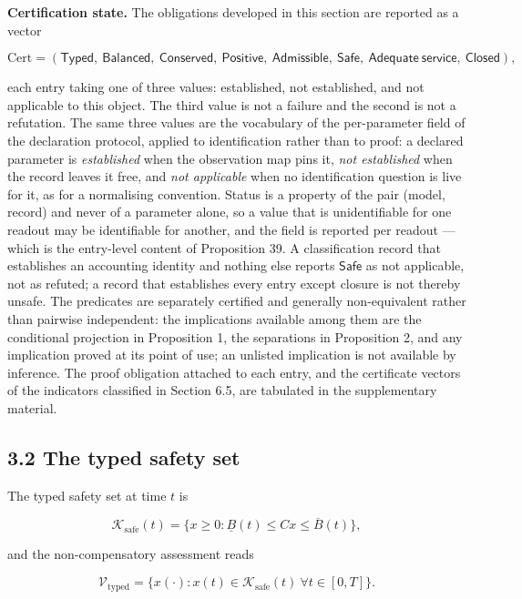 \documentclass[11pt]{article}
\begin{document}
\textbf{Certification state.} The obligations developed in this section are reported as a vector 

$$\mathrm{Cert}=(\mathsf{Typed},\ \mathsf{Balanced},\ \mathsf{Conserved},\ \mathsf{Positive},\ \mathsf{Admissible},\ \mathsf{Safe},\ \mathsf{Adequate\ service},\ \mathsf{Closed}),$$

 each entry taking one of three values: established, not established, and not applicable to this object. The third value is not a failure and the second is not a refutation. The same three values are the vocabulary of the per-parameter field of the declaration protocol, applied to identification rather than to proof: a declared parameter is \emph{established} when the observation map pins it, \emph{not established} when the record leaves it free, and \emph{not applicable} when no identification question is live for it, as for a normalising convention. Status is a property of the pair (model, record) and never of a parameter alone, so a value that is unidentifiable for one readout may be identifiable for another, and the field is reported per readout --- which is the entry-level content of Proposition 39. A classification record that establishes an accounting identity and nothing else reports \(\mathsf{Safe}\) as not applicable, not as refuted; a record that establishes every entry except closure is not thereby unsafe. The predicates are separately certified and generally non-equivalent rather than pairwise independent: the implications available among them are the conditional projection in Proposition 1, the separations in Proposition 2, and any implication proved at its point of use; an unlisted implication is not available by inference. The proof obligation attached to each entry, and the certificate vectors of the indicators classified in Section 6.5, are tabulated in the supplementary material.

\subsection*{3.2 The typed safety set}\label{32-the-typed-safety-set}

The typed safety set at time \(t\) is 

$$\mathcal{K}_{\mathrm{safe}}(t) = \{ x \ge 0 : \underline{B}(t) \le Cx \le \overline{B}(t) \},$$

 and the non-compensatory assessment reads 

$$\mathcal{V}_{\mathrm{typed}} = \{ x(\cdot) : x(t) \in \mathcal{K}_{\mathrm{safe}}(t)\ \forall t \in [0,T] \}.$$
\end{document}
